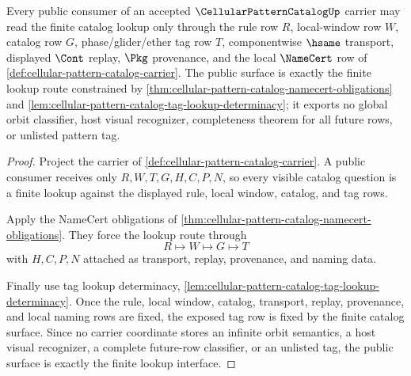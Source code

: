 \begin{theorem}
\label{thm:cellular-pattern-catalog-public-lookup-surface}
Every public consumer of an accepted $\CellularPatternCatalogUp$ carrier may read the finite catalog lookup only through the rule row $R$, local-window row $W$, catalog row $G$, phase/glider/ether tag row $T$, componentwise $\hsame$ transport, displayed $\Cont$ replay, $\Pkg$ provenance, and the local $\NameCert$ row of \autoref{def:cellular-pattern-catalog-carrier}. The public surface is exactly the finite lookup route constrained by \autoref{thm:cellular-pattern-catalog-namecert-obligations} and \autoref{lem:cellular-pattern-catalog-tag-lookup-determinacy}; it exports no global orbit classifier, host visual recognizer, completeness theorem for all future rows, or unlisted pattern tag.
\end{theorem}
\begin{proof}
Project the carrier of \autoref{def:cellular-pattern-catalog-carrier}. A public consumer receives only $R,W,T,G,H,C,P,N$, so every visible catalog question is a finite lookup against the displayed rule, local window, catalog, and tag rows.

Apply the NameCert obligations of \autoref{thm:cellular-pattern-catalog-namecert-obligations}. They force the lookup route through
$$
R \longmapsto W \longmapsto G \longmapsto T
$$
with $H,C,P,N$ attached as transport, replay, provenance, and naming data.

Finally use tag lookup determinacy, \autoref{lem:cellular-pattern-catalog-tag-lookup-determinacy}. Once the rule, local window, catalog, transport, replay, provenance, and local naming rows are fixed, the exposed tag row is fixed by the finite catalog surface. Since no carrier coordinate stores an infinite orbit semantics, a host visual recognizer, a complete future-row classifier, or an unlisted tag, the public surface is exactly the finite lookup interface.
\end{proof}

